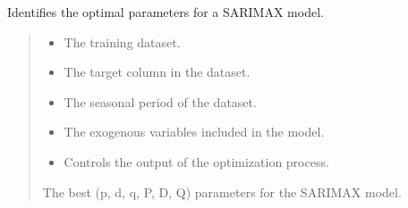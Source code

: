 \documentclass[letterpaper,10pt,english]{sphinxmanual}
\begin{document}
\begin{fulllineitems}
\label{\detokenize{docs/time_series_analysis:time_series_analysis.SARIMAX_optimizer}}
\pysigstartsignatures
{}
\pysigstopsignatures
\sphinxAtStartPar
Identifies the optimal parameters for a SARIMAX model.
\begin{quote}\begin{description}
\begin{itemize}
\item {} 
\sphinxAtStartPar
{} \textendash{} The training dataset.

\item {} 
\sphinxAtStartPar
{} \textendash{} The target column in the dataset.

\item {} 
\sphinxAtStartPar
{} \textendash{} The seasonal period of the dataset.

\item {} 
\sphinxAtStartPar
{} \textendash{} The exogenous variables included in the model.

\item {} 
\sphinxAtStartPar
{} \textendash{} Controls the output of the optimization process.

\end{itemize}

\sphinxAtStartPar
The best (p, d, q, P, D, Q) parameters for the SARIMAX model.

\end{description}\end{quote}

\end{fulllineitems}

\end{document}
